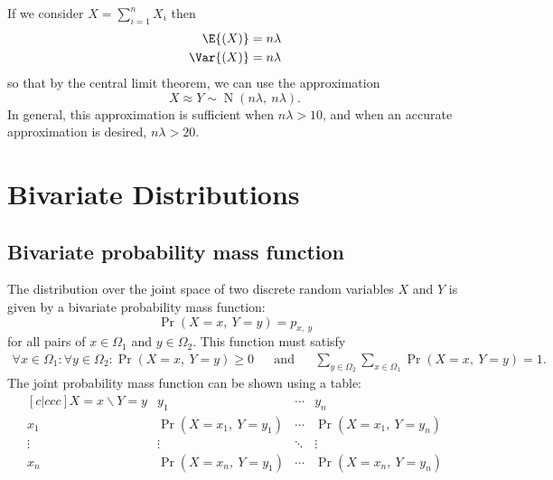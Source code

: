 \documentclass{article}
\begin{document}
\begin{multicols}{3}
    If we consider \(X = \sum_{i = 1}^n X_i\) then
    \begin{align*}
        \E{\left( X \right)}   & = n \lambda \\
        \Var{\left( X \right)} & = n \lambda
    \end{align*}
    so that by the central limit theorem, we can use the approximation
    \begin{equation*}
        X \approx Y \sim \operatorname{N}{\left( n\lambda,\: n\lambda \right)}.
    \end{equation*}
    In general, this approximation is sufficient when \(n \lambda > 10\), and when an accurate approximation is desired, \(n \lambda > 20\).
    \section{Bivariate Distributions}
    \subsection{Bivariate probability mass function}
    The distribution over the joint space of two discrete random variables \(X\) and \(Y\) is given by a bivariate probability mass function:
    \begin{equation*}
        \Pr{\left( X = x,\: Y = y \right)} = p_{x,\: y}
    \end{equation*}
    for all pairs of \(x \in \Omega_1\) and \(y \in \Omega_2\). This function must satisfy
    \begin{align*}
        \forall x \in \Omega_1 : \forall y \in \Omega_2 : \Pr{\left( X = x,\: Y = y \right)} \geq 0 &  & \text{and} &  &
        \sum_{y \in \Omega_2} \sum_{x \in \Omega_1} \Pr{\left( X = x,\: Y = y \right)} = 1.
    \end{align*}
    The joint probability mass function can be shown using a table:
    \begin{equation*}
        \begin{matrix}[c|ccc] %
            X=x \backslash Y=y & y_1                                    & \cdots & y_n                                    \\
            \hline %
            x_1                & \Pr{\left( X = x_1,\: Y = y_1 \right)} & \cdots & \Pr{\left( X = x_1,\: Y = y_n \right)} \\
            \vdots             & \vdots                                 & \ddots & \vdots                                 \\
            x_n                & \Pr{\left( X = x_n,\: Y = y_1 \right)} & \cdots & \Pr{\left( X = x_n,\: Y = y_n \right)}
        \end{matrix}
    \end{equation*}

\end{multicols}
\end{document}
